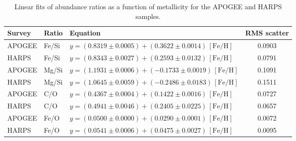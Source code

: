 \begin{table}
\caption{Linear fits of abundance ratios as a function of metallicity for the APOGEE and HARPS samples.}
\label{tab:linear_ratio_fits}
\centering
\begin{tabular}{lllc}
\hline\hline
Survey & Ratio & Equation & RMS scatter \\
\hline
APOGEE & Fe/Si & $y = (0.8319 \pm 0.0005) + (0.3622 \pm 0.0014)\,[\mathrm{Fe/H}]$ & 0.0903 \\
HARPS & Fe/Si & $y = (0.8343 \pm 0.0027) + (0.2593 \pm 0.0132)\,[\mathrm{Fe/H}]$ & 0.0791 \\
APOGEE & Mg/Si & $y = (1.1931 \pm 0.0006) + (-0.1733 \pm 0.0019)\,[\mathrm{Fe/H}]$ & 0.1091 \\
HARPS & Mg/Si & $y = (1.0645 \pm 0.0059) + (-0.2486 \pm 0.0183)\,[\mathrm{Fe/H}]$ & 0.1511 \\
APOGEE & C/O & $y = (0.4367 \pm 0.0004) + (0.1422 \pm 0.0016)\,[\mathrm{Fe/H}]$ & 0.0727 \\
HARPS & C/O & $y = (0.4941 \pm 0.0046) + (0.2405 \pm 0.0225)\,[\mathrm{Fe/H}]$ & 0.0657 \\
APOGEE & Fe/O & $y = (0.0500 \pm 0.0000) + (0.0290 \pm 0.0001)\,[\mathrm{Fe/H}]$ & 0.0072 \\
HARPS & Fe/O & $y = (0.0541 \pm 0.0006) + (0.0475 \pm 0.0027)\,[\mathrm{Fe/H}]$ & 0.0095 \\
\hline
\end{tabular}
\end{table}
